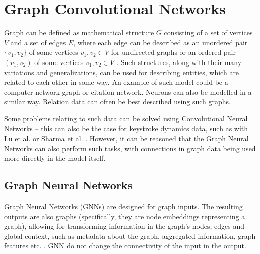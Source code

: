
\chapter{Graph Convolutional Networks}

Graph can be defined as mathematical structure $G$ consisting of a set of vertices $V$ and a set of edges $E$, where each edge can be described as an unordered pair $\{ v_1, v_2 \}$ of some vertices $v_1, v_2 \in V$ for undirected graphs or an ordered pair $( v_1, v_2 )$ of some vertices $v_1, v_2 \in V$ \cite{wikipedia_graph_2025}. Such structures, along with their many variations and generalizations, can be used for describing entities, which are related to each other in some way. An example of such model could be a computer network graph or citation network. Neurons can also be modelled in a similar way. Relation data can often be best described using such graphs. \cite{Lesk2024}

Some problems relating to such data can be solved using Convolutional Neural Networks -- this can also be the case for keystroke dynamics data, such as with Lu et al. \cite{Lu2020} or Sharma et al. \cite{Shar2023}. However, it can be reasoned that the Graph Neural Networks can also perform such tasks, with connections in graph data being used more directly in the model itself.

\section{Graph Neural Networks}
Graph Neural Networks (GNNs) are designed for graph inputs. The resulting outputs are also graphs (specifically, they are node embeddings representing a graph), allowing for transforming information in the graph's nodes, edges and global context, such as metadata about the graph, aggregated information, graph features etc. \cite{sanch2021}. GNN do not change the connectivity of the input in the output. 

